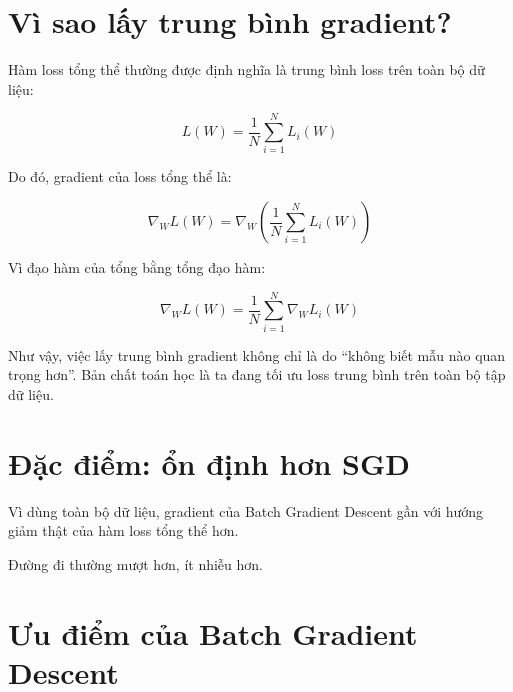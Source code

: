\documentclass[12pt,a4paper]{report}
\begin{document}
\section{Vì sao lấy trung bình gradient?}

Hàm loss tổng thể thường được định nghĩa là trung bình loss trên toàn bộ dữ liệu:

\[
    L(W)=\frac{1}{N}\sum_{i=1}^{N}L_i(W)
\]

Do đó, gradient của loss tổng thể là:

\[
    \nabla_W L(W)
    =
    \nabla_W
    \left(
    \frac{1}{N}
    \sum_{i=1}^{N}L_i(W)
    \right)
\]

Vì đạo hàm của tổng bằng tổng đạo hàm:

\[
    \nabla_W L(W)
    =
    \frac{1}{N}
    \sum_{i=1}^{N}
    \nabla_W L_i(W)
\]

Như vậy, việc lấy trung bình gradient không chỉ là do ``không biết mẫu nào quan trọng hơn''. Bản chất toán học là ta đang tối ưu loss trung bình trên toàn bộ tập dữ liệu.

\section{Đặc điểm: ổn định hơn SGD}

Vì dùng toàn bộ dữ liệu, gradient của Batch Gradient Descent gần với hướng giảm thật của hàm loss tổng thể hơn.

Đường đi thường mượt hơn, ít nhiễu hơn.

\begin{center}
\end{center}

\section{Ưu điểm của Batch Gradient Descent}
\end{document}
